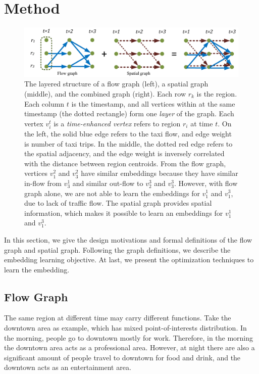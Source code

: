 \section{Method}
\label{ch3-sec:method}


\begin{figure}[t]
\centering
\includegraphics[width=1\linewidth]{fig/layered-graph-embedding.pdf}
\caption{The layered structure of a flow graph (left), a spatial graph (middle), and the combined graph (right). Each row $r_k$ is the region.  Each column $t$ is the timestamp, and all vertices within at the same timestamp (the dotted rectangle) form one \emph{layer} of the graph. Each vertex $v_i^t$ is a \emph{time-enhanced vertex} refers to region $r_i$ at time $t$. On the left, the solid blue edge refers to the taxi flow, and edge weight is number of taxi trips. In the middle, the dotted red edge refers to the spatial adjacency, and the edge weight is inversely correlated with the distance between region centroids. From the flow graph, vertices $v_1^2$ and $v_3^2$ have similar embeddings because they have similar in-flow from $v_3^1$ and similar out-flow to $v_2^3$ and $v_3^3$. However, with flow graph alone, we are not able to learn the embeddings for $v_1^1$ and $v_1^3$, due to lack of traffic flow. The spatial graph provides spatial information, which makes it possible to learn an embeddings for $v_1^1$ and $v_1^3$.}
\label{fig:layered-graph}
\end{figure}




In this section, we give the design motivations and formal definitions of the flow graph and spatial graph. Following the graph definitions, we describe the embedding learning objective. At last, we present the optimization techniques to learn the embedding.



\subsection{Flow Graph}
\label{sec:method:transition-graph}

The same region at different time may carry different functions. Take the downtown area as example, which has mixed point-of-interests distribution. In the morning, people go to downtown mostly for work. Therefore, in the morning the downtown area acts as a professional area. However, at night there are also a significant amount of people travel to downtown for food and drink, and the downtown acts as an entertainment area.

